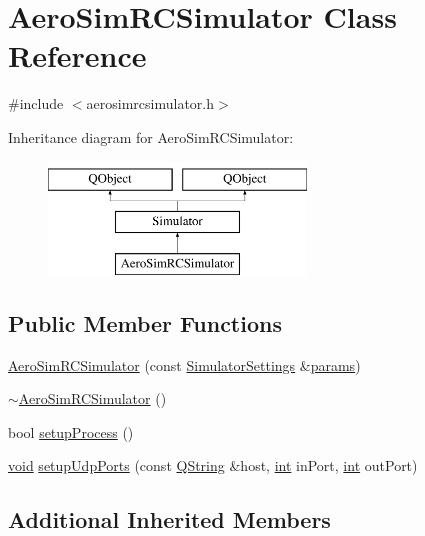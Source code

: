 \hypertarget{class_aero_sim_r_c_simulator}{\section{Aero\-Sim\-R\-C\-Simulator Class Reference}
\label{class_aero_sim_r_c_simulator}
}


{\ttfamily \#include $<$aerosimrcsimulator.\-h$>$}

Inheritance diagram for Aero\-Sim\-R\-C\-Simulator\-:\begin{figure}[H]
\begin{center}
\leavevmode
\includegraphics[height=3.000000cm]{class_aero_sim_r_c_simulator}
\end{center}
\end{figure}
\subsection*{Public Member Functions}
\begin{DoxyCompactItemize}
\item 
\hyperlink{group___h_i_t_l_plugin_ga0f5306deb22a08981f652dbb154f3e55}{Aero\-Sim\-R\-C\-Simulator} (const \hyperlink{group___h_i_t_l_plugin_ga052199f1328d3002bce3e45345aa7f4e}{Simulator\-Settings} \&\hyperlink{glext_8h_afeb6390ab3bc8a0e96a88aff34d52288}{params})
\item 
\hyperlink{group___h_i_t_l_plugin_ga8627049b9a905adb162384c682255bd3}{$\sim$\-Aero\-Sim\-R\-C\-Simulator} ()
\item 
bool \hyperlink{group___h_i_t_l_plugin_gae47d5533f13e5ad9a6095ba2bc61bade}{setup\-Process} ()
\item 
\hyperlink{group___u_a_v_objects_plugin_ga444cf2ff3f0ecbe028adce838d373f5c}{void} \hyperlink{group___h_i_t_l_plugin_ga593e2c3f1a4b5e541f32668be73ece6d}{setup\-Udp\-Ports} (const \hyperlink{group___u_a_v_objects_plugin_gab9d252f49c333c94a72f97ce3105a32d}{Q\-String} \&host, \hyperlink{ioapi_8h_a787fa3cf048117ba7123753c1e74fcd6}{int} in\-Port, \hyperlink{ioapi_8h_a787fa3cf048117ba7123753c1e74fcd6}{int} out\-Port)
\end{DoxyCompactItemize}
\subsection*{Additional Inherited Members}


